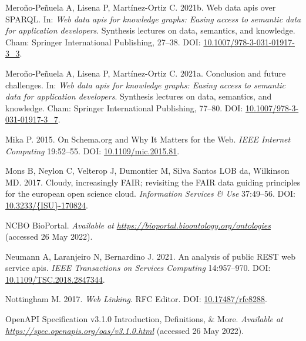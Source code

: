 \begin{CSLReferences}{1}{0}
\leavevmode{}%
Meroño-Peñuela A, Lisena P, Martínez-Ortiz C. 2021b. Web data apis over SPARQL. In: \emph{Web data apis for knowledge graphs: Easing access to semantic data for application developers}. Synthesis lectures on data, semantics, and knowledge. Cham: Springer International Publishing, 27--38. DOI: \href{https://doi.org/10.1007/978-3-031-01917-3_3}{10.1007/978-3-031-01917-3\_3}.

\leavevmode{}%
Meroño-Peñuela A, Lisena P, Martínez-Ortiz C. 2021a. Conclusion and future challenges. In: \emph{Web data apis for knowledge graphs: Easing access to semantic data for application developers}. Synthesis lectures on data, semantics, and knowledge. Cham: Springer International Publishing, 77--80. DOI: \href{https://doi.org/10.1007/978-3-031-01917-3_7}{10.1007/978-3-031-01917-3\_7}.

\leavevmode{}%
Mika P. 2015. On Schema.org and Why It Matters for the Web. \emph{IEEE Internet Computing} 19:52--55. DOI: \href{https://doi.org/10.1109/mic.2015.81}{10.1109/mic.2015.81}.

\leavevmode{}%
Mons B, Neylon C, Velterop J, Dumontier M, Silva Santos LOB da, Wilkinson MD. 2017. Cloudy, increasingly FAIR; revisiting the FAIR data guiding principles for the european open science cloud. \emph{Information Services \& Use} 37:49--56. DOI: \href{https://doi.org/10.3233/\%7BISU\%7D-170824}{10.3233/\{ISU\}-170824}.

\leavevmode{}%
NCBO BioPortal. \emph{Available at} \href{https://bioportal.bioontology.org/ontologies}{\emph{https://bioportal.bioontology.org/ontologies}} (accessed 26 May 2022).

\leavevmode{}%
Neumann A, Laranjeiro N, Bernardino J. 2021. An analysis of public REST web service apis. \emph{IEEE Transactions on Services Computing} 14:957--970. DOI: \href{https://doi.org/10.1109/TSC.2018.2847344}{10.1109/TSC.2018.2847344}.

\leavevmode{}%
Nottingham M. 2017. \emph{Web Linking}. RFC Editor. DOI: \href{https://doi.org/10.17487/rfc8288}{10.17487/rfc8288}.

\leavevmode{}%
OpenAPI Specification v3.1.0 \textbar{} Introduction, Definitions, \& More. \emph{Available at} \href{https://spec.openapis.org/oas/v3.1.0.html}{\emph{https://spec.openapis.org/oas/v3.1.0.html}} (accessed 26 May 2022).


\end{CSLReferences}

